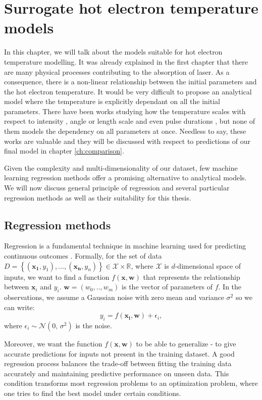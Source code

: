 \chapter{Surrogate hot electron temperature models}
\label{ch:models-theory}
In this chapter, we will talk about the models suitable for hot electron temperature modelling. It was already explained in the first chapter that there are many physical processes contributing to the absorption of laser. As a consequence, there is a non-linear relationship between the initial parameters and the hot electron temperature. It would be very difficult to propose an analytical model where the temperature is explicitly dependant on all the initial parameters. There have been works studying how the temperature scales with respect to intensity \cite{kluge2011,cui2013,miller2023,haines2009,beg1997}, angle \cite{cui2013} or length scale and even pulse durations \cite{miller2023}, but none of them models the dependency on all parameters at once. Needless to say, these works are valuable and they will be discussed with respect to predictions of our final model in chapter \ref{ch:comparison}.

Given the complexity and multi-dimensionality of our dataset, few machine learning regression methods offer a promising alternative to analytical models. We will now discuss general principle of regression and several particular regression methods as well as their suitability for this thesis.

\section{Regression methods}
Regression is a fundamental technique in machine learning used for predicting continuous outcomes \cite{bishop2006}. Formally, for the set of data $D = \left\{(\bm{x_1},y_1),...,(\bm{x_n},y_n)\right\}\in \mathcal{X}\times\mathbb{R}$, where $\mathcal{X}$ is $d$-dimensional space of inputs, we want to find a function $f(\bm{x},\bm{w})$ that represents the relationship between $\bm{x}_i$ and $y_i$. $\bm{w} = (w_0,..,w_{m})$ is the vector of parameters of $f$. In the observations, we assume a Gaussian noise with zero mean and variance $\sigma^2$ so we can write:
\begin{equation}
	y_i = f(\bm{x_i},\bm{w}) + \epsilon_i,
\end{equation}
where $\epsilon_i \sim \mathcal{N}(0,\,\sigma^{2})$ is the noise.

Moreover, we want the function $f(\bm{x},\bm{w})$ to be able to generalize - to give accurate predictions for inputs not present in the training dataset. A good regression process balances the trade-off between fitting the training data accurately and maintaining predictive performance on unseen data. This condition transforms most regression problems to an optimization problem, where one tries to find the best model under certain conditions.

